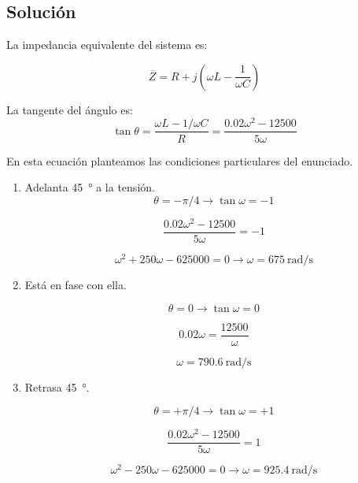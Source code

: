 \subsection*{Solución}
La impedancia equivalente del sistema es:

\begin{equation*}
  \overline{Z} = R + j (\omega L - \frac{1}{\omega C})
\end{equation*}

La tangente del ángulo es:
\begin{equation*}
  \tan \theta = \frac{\omega L - 1/\omega C}{R} = \frac{0.02\omega^2 - 12500}{5\omega}
\end{equation*}

En esta ecuación planteamos las condiciones particulares del enunciado.

\begin{enumerate}
\item Adelanta \qty{45}{\degree} a la tensión.
  \begin{equation*}
    \theta = -\pi/4 \rightarrow \tan \omega = -1
  \end{equation*}

  \begin{equation*}
    \frac{0.02\omega^2 - 12500}{5\omega} = -1
  \end{equation*}

  \begin{equation*}
    \omega^2 + 250\omega - 625000 = 0 \rightarrow \boxed{\omega = \qty{675}{\radian\per\second}}
  \end{equation*}

  
\item Está en fase con ella.

  \begin{equation*}
    \theta = 0 \rightarrow \tan \omega = 0
  \end{equation*}

  \begin{equation*}
    0.02\omega = \frac{12500}{\omega}
  \end{equation*}

  \begin{equation*}
    \omega = \qty{790.6}{\radian\per\second}
  \end{equation*}
  
\item Retrasa \qty{45}{\degree}.

  \begin{equation*}
    \theta = +\pi/4 \rightarrow \tan \omega = +1
  \end{equation*}

  \begin{equation*}
    \frac{0.02\omega^2 - 12500}{5\omega} = 1
  \end{equation*}

  \begin{equation*}
    \omega^2 - 250\omega - 625000 = 0 \rightarrow \boxed{\omega = \qty{925.4}{\radian\per\second}}
  \end{equation*}

\end{enumerate}


